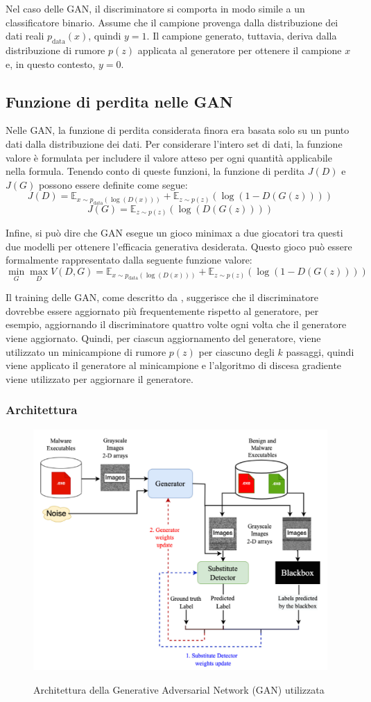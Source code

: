 Nel caso delle GAN, il discriminatore si comporta in modo simile a un classificatore binario. Assume che il campione provenga dalla distribuzione dei dati reali \( p_{\text{data}}(x) \), quindi \( y = 1 \). Il campione generato, tuttavia, deriva dalla distribuzione di rumore \( p(z) \) applicata al generatore per ottenere il campione \( x \) e, in questo contesto, \( y = 0 \).

\subsection{Funzione di perdita nelle GAN}
Nelle GAN, la funzione di perdita considerata finora era basata solo su un punto dati dalla distribuzione dei dati. Per considerare l'intero set di dati, la funzione valore è formulata per includere il valore atteso per ogni quantità applicabile nella formula. Tenendo conto di queste funzioni, la funzione di perdita \( J(D) \) e \( J(G) \) possono essere definite come segue:
\[
J(D) = \mathbb{E}_{x \sim p_{\text{data}}(\log(D(x)))} + \mathbb{E}_{z \sim p(z)}(\log(1 - D(G(z))))
\]
\[
J(G) = \mathbb{E}_{z \sim p(z)}(\log(D(G(z))))
\]

Infine, si può dire che GAN esegue un gioco minimax a due giocatori tra questi due modelli per ottenere l'efficacia generativa desiderata. Questo gioco può essere formalmente rappresentato dalla seguente funzione valore:
\[
\min_{G} \max_{D} V(D, G) = \mathbb{E}_{x \sim p_{\text{data}}(\log(D(x)))} + \mathbb{E}_{z \sim p(z)}(\log(1 - D(G(z))))
\]

Il training delle GAN, come descritto da , suggerisce che il discriminatore dovrebbe essere aggiornato più frequentemente rispetto al generatore, per esempio, aggiornando il discriminatore quattro volte ogni volta che il generatore viene aggiornato.
Quindi, per ciascun aggiornamento del generatore, viene utilizzato un minicampione di rumore \( p(z) \) per ciascuno degli \( k \) passaggi, quindi viene applicato il generatore al minicampione e l'algoritmo di discesa gradiente viene utilizzato per aggiornare il generatore.


\subsubsection{Architettura}
\begin{figure}[ht]
    \centering
        \centering
        \includegraphics[width=0.6\linewidth]{images/GAN_architecture.png}
        \label{fig:gan_architecture}
        \caption{Architettura della Generative Adversarial Network (GAN) utilizzata}
\end{figure}
\newpage
